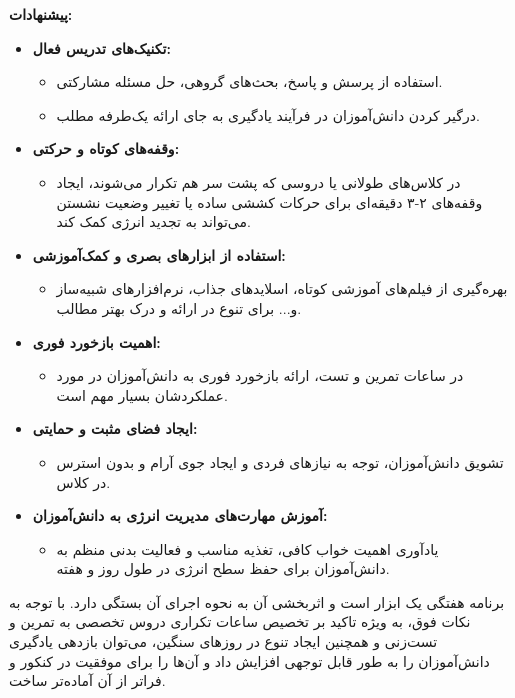\documentclass[a4paper]{article}
\begin{document}
\textbf{پیشنهادات:}
\begin{itemize}
    \item \textbf{تکنیک‌های تدریس فعال:}
        \begin{itemize}
            \item استفاده از پرسش و پاسخ، بحث‌های گروهی، حل مسئله مشارکتی.
            \item درگیر کردن دانش‌آموزان در فرآیند یادگیری به جای ارائه یک‌طرفه مطلب.
        \end{itemize}
    \item \textbf{وقفه‌های کوتاه و حرکتی:}
        \begin{itemize}
            \item در کلاس‌های طولانی یا دروسی که پشت سر هم تکرار می‌شوند، ایجاد وقفه‌های ۲-۳ دقیقه‌ای برای حرکات کششی ساده یا تغییر وضعیت نشستن می‌تواند به تجدید انرژی کمک کند.
        \end{itemize}
    \item \textbf{استفاده از ابزارهای بصری و کمک‌آموزشی:}
        \begin{itemize}
            \item بهره‌گیری از فیلم‌های آموزشی کوتاه، اسلایدهای جذاب، نرم‌افزارهای شبیه‌ساز و... برای تنوع در ارائه و درک بهتر مطالب.
        \end{itemize}
    \item \textbf{اهمیت بازخورد فوری:}
        \begin{itemize}
            \item در ساعات تمرین و تست، ارائه بازخورد فوری به دانش‌آموزان در مورد عملکردشان بسیار مهم است.
        \end{itemize}
    \item \textbf{ایجاد فضای مثبت و حمایتی:}
        \begin{itemize}
            \item تشویق دانش‌آموزان، توجه به نیازهای فردی و ایجاد جوی آرام و بدون استرس در کلاس.
        \end{itemize}
    \item \textbf{آموزش مهارت‌های مدیریت انرژی به دانش‌آموزان:}
        \begin{itemize}
            \item یادآوری اهمیت خواب کافی، تغذیه مناسب و فعالیت بدنی منظم به دانش‌آموزان برای حفظ سطح انرژی در طول روز و هفته.
        \end{itemize}
\end{itemize}
\bigskip

برنامه هفتگی یک ابزار است و اثربخشی آن به نحوه اجرای آن بستگی دارد. با توجه به نکات فوق، به ویژه تاکید بر تخصیص ساعات تکراری دروس تخصصی به تمرین و تست‌زنی و همچنین ایجاد تنوع در روزهای سنگین، می‌توان بازدهی یادگیری دانش‌آموزان را به طور قابل توجهی افزایش داد و آن‌ها را برای موفقیت در کنکور و فراتر از آن آماده‌تر ساخت.
\end{document}
